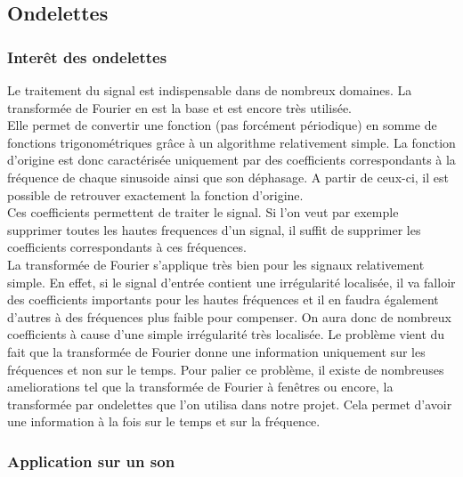 \documentclass[a4paper,12pt]{article}
\begin{document}
	\subsection{Ondelettes}

        	\subsubsection{Interêt des ondelettes}

Le traitement du signal est indispensable dans de nombreux domaines. La
transformée de Fourier en est la base et est encore très utilisée.\\
Elle permet de convertir une fonction (pas forcément périodique) en somme de
fonctions trigonométriques grâce à un algorithme relativement simple. La
fonction d'origine est donc caractérisée uniquement par des coefficients correspondants à
la fréquence de chaque sinusoide ainsi que son déphasage. A partir de ceux-ci,
il est possible de retrouver exactement la fonction d'origine.\\
Ces coefficients permettent de traiter le signal. Si l'on veut par exemple
supprimer toutes les hautes frequences d'un signal, il suffit de supprimer les
coefficients correspondants à ces fréquences.\\
La transformée de Fourier s'applique très bien pour les signaux relativement simple.
En effet, si le signal d'entrée contient une irrégularité localisée, il va
falloir des coefficients importants pour les hautes fréquences et il en faudra
également d'autres à des fréquences plus faible pour compenser. On aura donc de
nombreux coefficients à cause d'une simple irrégularité très localisée. Le
problème vient du fait que la transformée de Fourier donne une information
uniquement sur les fréquences et non sur le temps. Pour palier ce problème, il
existe de nombreuses ameliorations tel que la transformée de Fourier à fenêtres
ou encore, la transformée par ondelettes que l'on utilisa dans notre projet.
Cela permet d'avoir une information à la fois sur le temps et sur la
fréquence.\\

		\subsubsection{Application sur un son}
\end{document}
